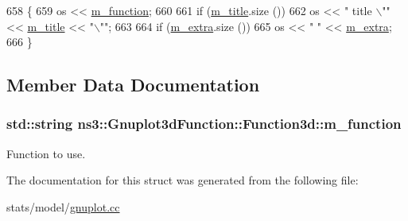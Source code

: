 \begin{DoxyCode}
658 \{
659   os << \hyperlink{structns3_1_1Gnuplot3dFunction_1_1Function3d_a27c677166847f2c04a99a9c280ecdd22}{m\_function};
660 
661   \textcolor{keywordflow}{if} (\hyperlink{structns3_1_1GnuplotDataset_1_1Data_ab8c0e78c05f666aaf901794a1e2b06ab}{m\_title}.size ())
662     os << \textcolor{stringliteral}{" title \(\backslash\)""} << \hyperlink{structns3_1_1GnuplotDataset_1_1Data_ab8c0e78c05f666aaf901794a1e2b06ab}{m\_title} << \textcolor{stringliteral}{"\(\backslash\)""};
663 
664   \textcolor{keywordflow}{if} (\hyperlink{structns3_1_1GnuplotDataset_1_1Data_a25343752a00d9ed36df0d3996e177277}{m\_extra}.size ())
665     os << \textcolor{stringliteral}{" "} << \hyperlink{structns3_1_1GnuplotDataset_1_1Data_a25343752a00d9ed36df0d3996e177277}{m\_extra};
666 \}
\end{DoxyCode}


\subsection{Member Data Documentation}
\subsubsection[{\texorpdfstring{m\+\_\+function}{m_function}}]{\setlength{\rightskip}{0pt plus 5cm}std\+::string ns3\+::\+Gnuplot3d\+Function\+::\+Function3d\+::m\+\_\+function}\hypertarget{structns3_1_1Gnuplot3dFunction_1_1Function3d_a27c677166847f2c04a99a9c280ecdd22}{}\label{structns3_1_1Gnuplot3dFunction_1_1Function3d_a27c677166847f2c04a99a9c280ecdd22}


Function to use. 



The documentation for this struct was generated from the following file\+:\begin{DoxyCompactItemize}
\item 
stats/model/\hyperlink{gnuplot_8cc}{gnuplot.\+cc}\end{DoxyCompactItemize}
